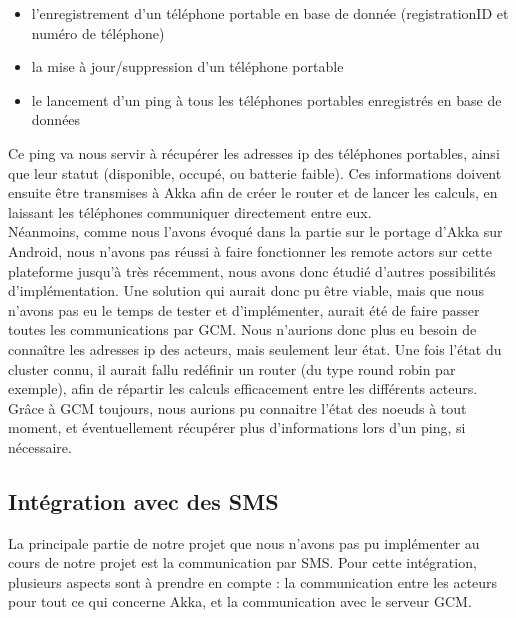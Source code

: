\documentclass[a4paper,12pt]{article}
\begin{document}
\begin{itemize}
\item l’enregistrement d’un téléphone portable en base de donnée
  (registrationID et numéro de téléphone)\\
\item la mise à jour/suppression d’un téléphone portable\\
\item le lancement d’un ping à tous les téléphones portables enregistrés en
  base de données
\end{itemize}
Ce ping va nous servir à récupérer les adresses ip des téléphones portables,
ainsi que leur statut (disponible, occupé, ou batterie faible). Ces
informations doivent ensuite être transmises à Akka afin de créer le router et
de lancer les calculs, en laissant les téléphones communiquer directement entre
eux.\\


Néanmoins, comme nous l’avons évoqué dans la partie sur le portage
d’Akka sur Android, nous n’avons pas réussi à faire fonctionner les remote
actors sur cette plateforme jusqu’à très récemment, nous avons donc étudié
d’autres possibilités d’implémentation.  Une solution qui aurait donc pu être
viable, mais que nous n’avons pas eu le temps de tester et d’implémenter,
aurait été de faire passer toutes les communications par GCM. Nous n’aurions
donc plus eu besoin de connaître les adresses ip des acteurs, mais seulement
leur état. Une fois l’état du cluster connu, il aurait fallu redéfinir un
router (du type round robin par exemple), afin de répartir les calculs
efficacement entre les différents acteurs. Grâce à GCM toujours, nous aurions
pu connaitre l’état des noeuds à tout moment, et éventuellement récupérer plus
d’informations lors d’un ping, si nécessaire.

\subsection{Intégration avec des SMS}
La principale partie de notre projet que nous n’avons pas pu implémenter au
cours de notre projet est la communication par SMS.  Pour cette intégration,
plusieurs aspects sont à prendre en compte : la communication entre les acteurs
pour tout ce qui concerne Akka, et la communication avec le serveur GCM.\\
\end{document}
